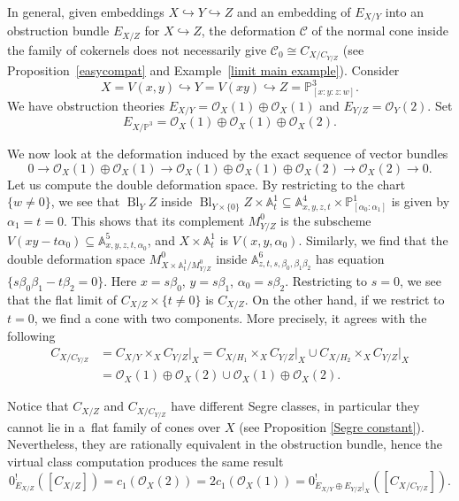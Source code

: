 \documentclass[pdftex]{sigma}
\numberwithin{equation}{section}
\newcommand{\OO}{\mathcal{O}}
\newcommand{\PP}{\mathbb P}
\theoremstyle{plain}
\theoremstyle{definition}
\theoremstyle{remark}
\begin{document}
\begin{Example}\label{nonlimit}In general, given embeddings $X\hookrightarrow Y\hookrightarrow Z$ and an embedding of $E_{X/Y}$ into an obstruction bundle $E_{X/Z}$ for $X\hookrightarrow Z$, the deformation $\mathcal C$ of the normal cone inside the family of cokernels does not necessarily give $\mathcal C_0\cong C_{X/C_{Y/Z}}$ (see Proposition~\ref{easycompat} and Example~\ref{limit main example}).
Consider
 \[
 X=V(x,y)\hookrightarrow Y=V(xy)\hookrightarrow Z=\PP^3_{[x:y:z:w]}.
 \]
We have obstruction theories $E_{X/Y}=\OO_X(1)\oplus\OO_X(1)$ and $E_{Y/Z}=\OO_Y(2)$. Set
\[
E_{X/\PP^3}=\OO_X(1)\oplus\OO_X(1)\oplus\OO_X(2).
\]

We now look at the deformation induced by the exact sequence of vector bundles
 \[
 0\to \OO_X(1)\oplus\OO_X(1)\to\OO_X(1)\oplus\OO_X(1)\oplus\OO_X(2)\to\OO_X(2)\to 0.
 \]
Let us compute the double deformation space. By restricting to the chart $\{w\neq 0\}$, we see that $\operatorname{Bl}_Y Z$ inside $\operatorname{Bl}_{Y\times\{0\}} Z\times\mathbb A^1_t\subseteq \mathbb A^4_{x,y,z,t}\times\PP^1_{[\alpha_0:\alpha_1]}$ is given by $\alpha_1=t=0$. This shows that its complement $M^0_{Y/Z}$ is the subscheme $V(xy-t\alpha_0)\subseteq \mathbb A^5_{x,y,z,t,\alpha_0}$, and $X\times\mathbb A^1_t$ is $V(x,y,\alpha_0)$. Similarly, we find that the double deformation space $M^0_{X\times\mathbb A^1_t/M^0_{Y/Z}}$ inside $\mathbb A^6_{z,t,s,\beta_0,\beta_1\beta_2}$ has equation $\{s\beta_0\beta_1-t\beta_2=0\}$. Here $x=s\beta_0$, $y=s\beta_1$, $\alpha_0=s\beta_2$. Restricting to $s=0$, we see that the flat limit of $C_{X/Z}\times\{t\neq 0\}$ is $C_{X/Z}$. On the other hand, if we restrict to $t=0$, we find a cone with two components. More precisely, it agrees with the following
\begin{align*}
C_{X/C_{Y/Z}}&=C_{X/Y}\times_X C_{Y/Z}\rvert_X =C_{X/H_1}\times_{X} C_{Y/Z}\rvert_{X}\cup C_{X/H_2}\times_{X} C_{Y/Z}\rvert_{X}\\
&=\OO_X(1)\oplus\OO_X(2)\cup \OO_X(1)\oplus\OO_X(2).
\end{align*}

Notice that $C_{X/Z}$ and $C_{X/C_{Y/Z}}$ have different Segre classes, in particular they cannot lie in a~flat family of cones over $X$ (see Proposition \ref{Segre constant}). Nevertheless, they are rationally equivalent in the obstruction bundle, hence the virtual class computation produces the same result
\[0^!_{E_{X/Z}}([C_{X/Z}])=c_1(\OO_X(2))=2 c_1(\OO_X(1))=0^!_{E_{X/Y}\oplus E_{Y/Z}\rvert_X}([C_{X/C_{Y/Z}}]).
\]
\end{Example}
\end{document}
